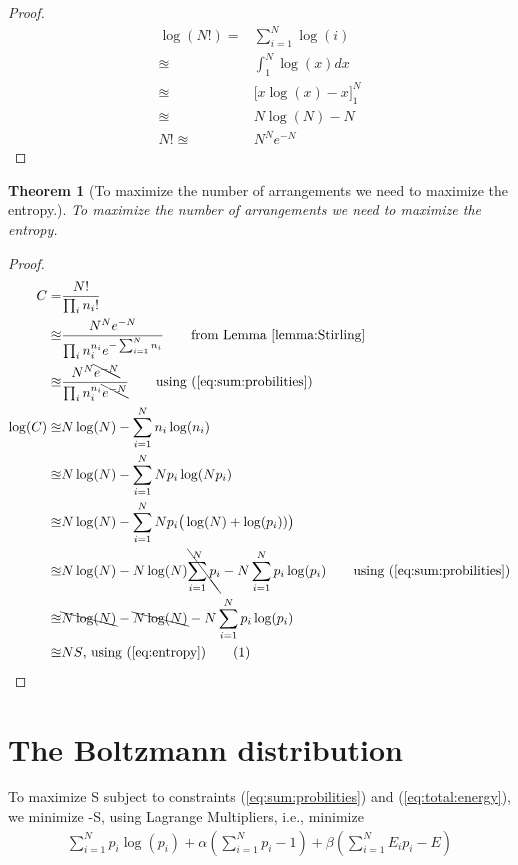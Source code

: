 \documentclass[]{article}
\newcommand\numberthis{\addtocounter{equation}{1}\tag{\theequation}}
\newtheorem{thm}{Theorem}
\begin{document}
\begin{proof}
	\begin{align*}
	\log(N!) =& \sum_{i=1}^{N}\log (i)\\
	\approxeq &\int_{1}^{N} \log(x) dx\\
	\approxeq& \big[x \log(x) - x \big]_1^N\\
	\approxeq& N\log(N)-N\\
	N! \approxeq& N^N e^{-N}
	\end{align*}
\end{proof}	

\begin{thm}[To maximize the number of arrangements we need to maximize the entropy.]
	To maximize the number of arrangements we need to maximize the entropy.
\end{thm}

\begin{proof}
	\begin{align*}
	C=&\frac{N!}{\prod_{i}n_i!}\\
	\approxeq& \frac{N^N e^{-N}}{\prod_{i}n_i^{n_i} e^{-\sum_{i=1}^{N}n_i}}\tag*{from Lemma \ref{lemma:Stirling}}\\
	\approxeq& \frac{N^N \bcancel{e^{-N}}}{\prod_{i}n_i^{n_i} \bcancel{e^{-N}}}\tag*{using (\ref{eq:sum:probilities})}\\
	\log(C) \approxeq & N \log(N) - \sum_{i=1}^{N} n_i \log(n_i)\\
	\approxeq& N \log(N) - \sum_{i=1}^{N} N p_i \log(N p_i)\\
	\approxeq& N \log(N) - \sum_{i=1}^{N} N p_i \big(\log(N) + \log(p_i))\big)\\
	\approxeq& N \log(N) -  N \log(N) \bcancel{\sum_{i=1}^{N} p_i}  - N \sum_{i=1}^{N}p_i \log(p_i)\tag*{using (\ref{eq:sum:probilities})}\\
	\approxeq& \bcancel{N \log(N)} - \bcancel{N \log(N)}  - N \sum_{i=1}^{N}p_i \log(p_i)\\
	\approxeq& NS \text{, using (\ref{eq:entropy})} \numberthis \label{eq:entropy:logC}
	\end{align*}
\end{proof}

\section{The Boltzmann distribution}

To maximize S subject to constraints (\ref{eq:sum:probilities}) and (\ref{eq:total:energy}), we minimize -S, using Lagrange Multipliers, i.e., minimize
\begin{align*}
\sum_{i=1}^{N}p_i \log(p_i) + \alpha(\sum_{i=1}^{N} p_i-1) + \beta(\sum_{i=1}^{N} E_i p_i-E)
\end{align*}
\end{document}
